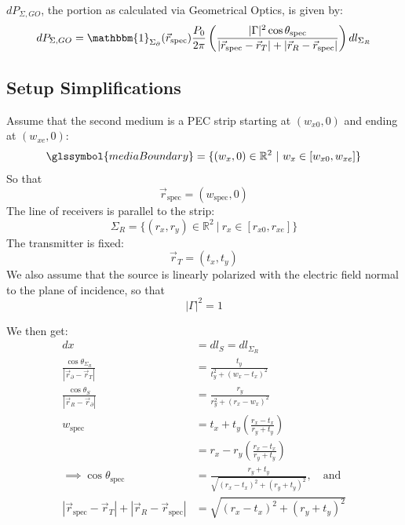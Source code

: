 \documentclass{article}
\begin{document}
$dP_{\Sigma, GO}$, the portion as calculated via Geometrical Optics, is given by:
\begin{equation}
   dP_{\Sigma, GO} = \mathbbm{1}_{\Sigma_\partial} (\vec{r}_{\text{spec}})
      \frac{P_0}{2 \pi} \left( \frac{|\Gamma|^2 \cos \theta_{\text{spec}}}{
      |\vec{r}_{\text{spec}} - \vec{r}_T| + |\vec{r}_R - \vec{r}_{\text{spec}}| }
      \right) dl_{\Sigma_R}
   \label{eq:GOPowerCalc}
\end{equation}

\subsection{Setup Simplifications}
Assume that the second medium is a PEC strip starting at $(w_{x0}, 0)$ and ending at
$(w_{xe}, 0)$:
\begin{equation}
   \glssymbol{mediaBoundary} = \{ (w_x, 0) \in \mathbb{R}^2 \ | \ w_x \in [ w_{x0}, w_{xe} ] \}
   \label{eq:boundaryPosition}
\end{equation}
So that
\begin{equation}
   \vec{r}_{\text{spec}} = ( w_{\text{spec}}, 0 )
   \label{eq:specPointFlatWall}
\end{equation}
The line of receivers is parallel to the strip:
\begin{equation}
   \Sigma_{R} = \{ (r_x, r_y) \in \mathbb{R}^2 \ | \ r_x \in [ r_{x0}, r_{xe} ] \}
   \label{eq:receiverPositions}
\end{equation}
The transmitter is fixed:
\begin{equation}
   \vec{r}_T = (t_x, t_y)
   \label{eq:transmitterPosition}
\end{equation}
We also assume that the source is linearly polarized with the electric field normal
to the plane of incidence, so that 
\begin{equation}
   |\Gamma|^2 = 1
   \label{eq:polarizationSimplification}
\end{equation}

We then get:
\begin{align*}
   dx &= dl_{S} = dl_{\Sigma_R} \\
   \frac{\cos \theta_{\Sigma_R}}{| \vec{r}_{\partial} - \vec{r}_T |} &= \frac{t_y}{t^2_y + (w_x - t_x)^2} \\
   \frac{\cos \theta_{S}}{| \vec{r}_{R} - \vec{r}_{\partial} |} &= \frac{r_y}{r^2_y + (r_x - w_x)^2} \\
   w_{\text{spec}} &= t_x + t_y \left( \frac{r_x - t_x}{r_y + t_y} \right) \\
   &= r_x - r_y \left( \frac{r_x - t_x}{r_y + t_y} \right) \\
   \implies \cos \theta_{\text{spec}} &= \frac{r_y + t_y}{\sqrt{(r_x - t_x)^2 +
      (r_y+t_y)^2}}, \quad \text{and} \\
   |\vec{r}_{\text{spec}} - \vec{r}_T| + |\vec{r}_R - \vec{r}_{\text{spec}}| &=
      \sqrt{(r_x - t_x)^2 + (r_y + t_y)^2}
\end{align*}
\end{document}
